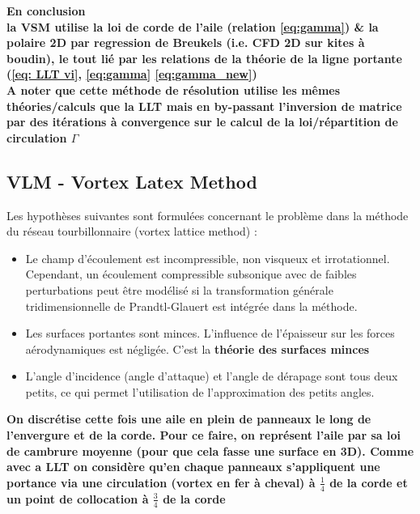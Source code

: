 \textbf{En conclusion}\\
\textbf{la VSM utilise la loi de corde de l'aile (relation \ref{eq:gamma}) \& la polaire 2D par regression de Breukels (i.e. CFD 2D sur kites à boudin), le tout lié par les relations de la théorie de la ligne portante (\ref{eq: LLT vi}, \ref{eq:gamma} \ref{eq:gamma_new})}\\

\textbf{A noter que cette méthode de résolution utilise les mêmes théories/calculs que la LLT mais en by-passant l'inversion de matrice par des itérations à convergence sur le calcul de la loi/répartition de circulation $\Gamma$}\\

\subsection{VLM - Vortex Latex Method} 
\label{subsec:Ch1.2.3}

Les hypothèses suivantes sont formulées concernant le problème dans la méthode du réseau tourbillonnaire (vortex lattice method) :\\
\begin{itemize}
    \item Le champ d'écoulement est incompressible, non visqueux et irrotationnel. Cependant, un écoulement compressible subsonique avec de faibles perturbations peut être modélisé si la transformation générale tridimensionnelle de Prandtl-Glauert est intégrée dans la méthode.
    \item Les surfaces portantes sont minces. L'influence de l'épaisseur sur les forces aérodynamiques est négligée. C'est la \textbf{théorie des surfaces minces}
    \item L'angle d'incidence (angle d'attaque) et l'angle de dérapage sont tous deux petits, ce qui permet l'utilisation de l'approximation des petits angles.
\end{itemize}

\textbf{On discrétise cette fois une aile en plein de panneaux le long de l'envergure et de la corde. Pour ce faire, on représent l'aile par sa loi de cambrure moyenne (pour que cela fasse une surface en 3D). Comme avec a LLT on considère qu'en chaque panneaux s'appliquent une portance via une circulation (vortex en fer à cheval) à $\frac{1}{4}$ de la corde et un point de collocation à $\frac{3}{4}$ de la corde}

